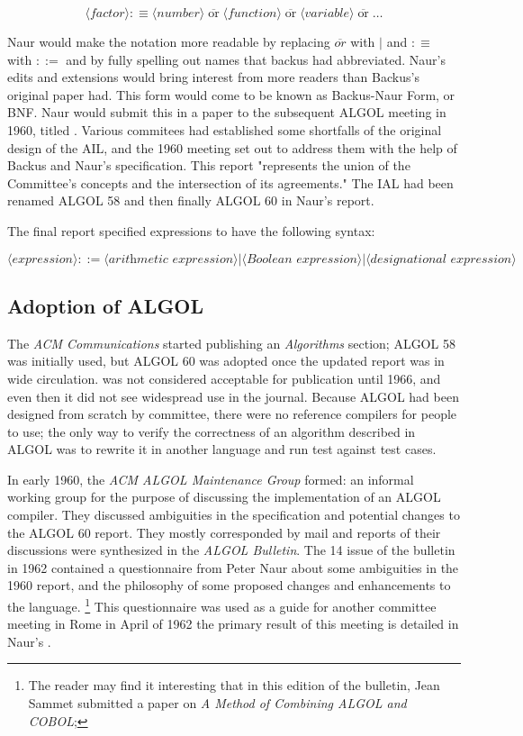 \[
	\langle \textit{factor} \rangle :\equiv
	\langle \textit{number} \rangle \;\overline{\text{or}}\;
	\langle \textit{function} \rangle \;\overline{\text{or}}\;
	\langle \textit{variable} \rangle \;\overline{\text{or}}\;
	\dots
\]

Naur would make the notation more readable by replacing $\overbar{or}$ with $|$
and $:\equiv$ with $::=$ and by fully spelling out names that backus had abbreviated.
Naur's edits and extensions would bring interest from more readers than Backus's original paper had.
This form would come to be known as Backus-Naur Form, or BNF.
Naur would submit this in a paper to the subsequent ALGOL meeting in 1960,
titled \cite{naur_backus_algol_1960}.
Various commitees had established some shortfalls of the original design of the AIL,
and the 1960 meeting set out to address them with the help of Backus and Naur's
specification.
This report "represents the union of the Committee's concepts and the
intersection of its agreements."
The IAL had been renamed ALGOL 58 and then finally ALGOL 60 in Naur's report.

The final report specified expressions to have the following syntax:

\[
	\langle \textit{expression} \rangle ::=
	\langle \textit{arithmetic expression} \rangle
	| \langle \textit{Boolean expression} \rangle
	| \langle \textit{designational expression} \rangle
\]

\subsection{Adoption of ALGOL}

The \textit{ACM Communications} started publishing an \textit{Algorithms} section;
ALGOL 58 was initially used, but ALGOL 60 was adopted once the updated report
was in wide circulation.
\FTN was not considered acceptable for publication until 1966, and even then
it did not see widespread use in the journal.
Because ALGOL had been designed from scratch by committee, there were
no reference compilers for people to use; the only way to verify the correctness
of an algorithm described in ALGOL was to rewrite it in another language
and run test against test cases.

In early 1960, the \textit{ACM ALGOL Maintenance Group} formed: an informal working
group for the purpose of discussing the implementation of an ALGOL compiler.
They discussed ambiguities in the specification and potential changes to the ALGOL 60 report.
They mostly corresponded by mail and reports of their discussions were synthesized in
the \textit{ALGOL Bulletin}\cite{sammet_programming_languages_history_and_fundamentals_1969}.
The 14 issue of the bulletin in 1962 contained a questionnaire from Peter Naur
about some ambiguities in the 1960 report, and the philosophy of some proposed changes and
enhancements to the language.
\footnote{The reader may find it interesting that in this edition of the bulletin,
	Jean Sammet submitted a paper on \textit{A Method of Combining ALGOL and COBOL};
	}
This questionnaire was used as a guide for another committee meeting in Rome in April of 1962
the primary result of this meeting is detailed in Naur's
.

